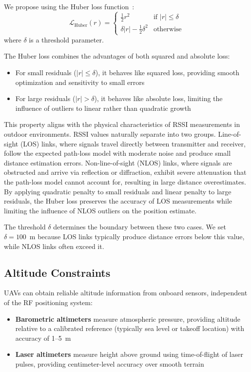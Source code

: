 \documentclass[master,final,11pt]{iscs-thesis}
\begin{document}
We propose using the Huber loss function~\cite{huber1964robust}:
\begin{equation}
    \mathcal{L}_{\text{Huber}}(r) = 
    \begin{cases} 
        \frac{1}{2} r^2 & \text{if } |r| \leq \delta \\
        \delta |r| - \frac{1}{2} \delta^2 & \text{otherwise}
    \end{cases}
    \label{eq:huber}
\end{equation}
where $\delta$ is a threshold parameter.

The Huber loss combines the advantages of both squared and absolute loss:
\begin{itemize}
    \item For small residuals ($|r| \leq \delta$), it behaves like squared loss, providing smooth optimization and sensitivity to small errors
    \item For large residuals ($|r| > \delta$), it behaves like absolute loss, limiting the influence of outliers to linear rather than quadratic growth
\end{itemize}

This property aligns with the physical characteristics of RSSI measurements in outdoor environments.
RSSI values naturally separate into two groups.
Line-of-sight (LOS) links, where signals travel directly between transmitter and receiver, follow the expected path-loss model with moderate noise and produce small distance estimation errors.
Non-line-of-sight (NLOS) links, where signals are obstructed and arrive via reflection or diffraction, exhibit severe attenuation that the path-loss model cannot account for, resulting in large distance overestimates.
By applying quadratic penalty to small residuals and linear penalty to large residuals, the Huber loss preserves the accuracy of LOS measurements while limiting the influence of NLOS outliers on the position estimate.

The threshold $\delta$ determines the boundary between these two cases.
We set $\delta = 100$~m because LOS links typically produce distance errors below this value, while NLOS links often exceed it.

\subsection{Altitude Constraints}
\label{sec:altitude_constraints}

UAVs can obtain reliable altitude information from onboard sensors, independent of the RF positioning system:
\begin{itemize}
    \item \textbf{Barometric altimeters} measure atmospheric pressure, providing altitude relative to a calibrated reference (typically sea level or takeoff location) with accuracy of 1--5~m
    \item \textbf{Laser altimeters} measure height above ground using time-of-flight of laser pulses, providing centimeter-level accuracy over smooth terrain
\end{itemize}
\end{document}

